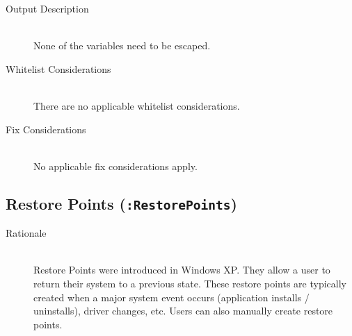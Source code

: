 \begin{description}
\item[Output Description] \hfill \\
None of the variables need to be escaped.
\item[Whitelist Considerations] \hfill \\
There are no applicable whitelist considerations.
\item[Fix Considerations] \hfill \\
No applicable fix considerations apply.  
\end{description}

\subsection{Restore Points (\texttt{:RestorePoints})}
\begin{description}
\item[Rationale] \hfill \\
Restore Points were introduced in Windows XP.  They allow a user to return their
system to a previous state.  These restore points are typically created when a
major system event occurs (application installs / uninstalls), driver changes,
etc.  Users can also manually create restore points. 


\end{description}
